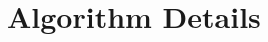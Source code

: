 \documentclass[letterpaper, 10 pt, conference]{ieeeconf}  %
\begin{document}
\section{Algorithm Details}
\label{sec_details}


%
%
\end{document}
